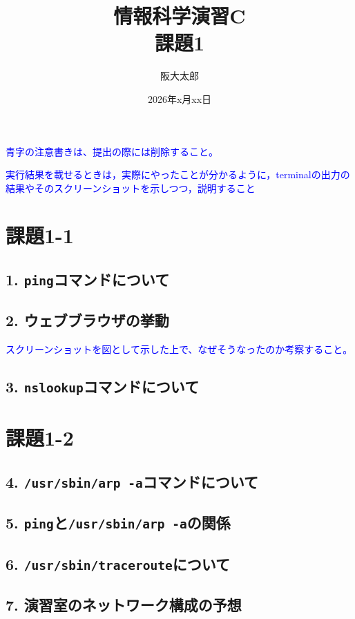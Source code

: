 \documentclass[10pt,titlepage]{jsarticle}
\title{情報科学演習C \\ 課題1}
\author{阪大太郎}
\affiliation{基礎工学部xxコース}
\date{2026年x月xx日}
\begin{document}
\maketitle 

\textcolor{blue}{青字の注意書きは、提出の際には削除すること。}

\textcolor{blue}{実行結果を載せるときは，実際にやったことが分かるように，terminalの出力の結果やそのスクリーンショットを示しつつ，説明すること}

\section{課題1-1}


\subsection*{1. \texttt{ping}コマンドについて}

\subsection*{2. ウェブブラウザの挙動}

\textcolor{blue}{スクリーンショットを図として示した上で、なぜそうなったのか考察すること。}

\subsection*{3. \texttt{nslookup}コマンドについて}


\section{課題1-2}

\subsection*{4. \texttt{/usr/sbin/arp -a}コマンドについて}

\subsection*{5. \texttt{ping}と\texttt{/usr/sbin/arp -a}の関係}

\subsection*{6. \texttt{/usr/sbin/traceroute}について}

\subsection*{7. 演習室のネットワーク構成の予想}
\end{document}
